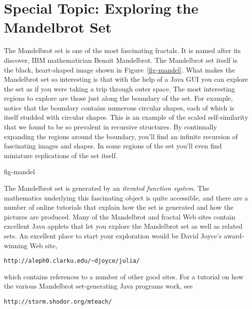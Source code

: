 \section*{{\color{cyan}Special Topic:} Exploring the Mandelbrot Set}

\noindent The Mandelbrot set is one of the most fascinating fractals.
It is named after its discover, IBM mathematician Benoit Mandelbrot.
The Mandelbrot set itself is the black, heart-shaped image shown in
Figure~\ref{fig-mandel}.  What makes the Mandelbrot set so interesting is that
with the help of a Java GUI you can explore the set as if you were
taking a trip through outer space.  %
The most interesting regions to explore are those just along the
boundary of the set.  For example, notice that the boundary contains
numerous circular shapes, each of which is itself studded with
circular shapes.  This is an example of the scaled self-similarity that
we found to be so prevalent in recursive structures.  By continually
expanding the regions around the boundary, you'll find an infinite
recursion of fascinating images and shapes.  In some regions of the set
you'll even find miniature replications of the set itself.  %

{fig-mandel}

The Mandelbrot set is generated by an {\it iterated function system}.
The mathematics underlying this fascinating object is quite
accessible, and there are a number of online tutorials that explain how
the set is generated and how the pictures are produced.  Many of the
Mandelbrot and fractal Web sites contain excellent Java applets that
let you explore the Mandelbrot set as well as related sets.   %
An excellent place to start your exploration would be David Joyce's
award-winning Web site,
\begin{jjjlisting}
\begin{lstlisting}[commentstyle=\color{black}]
http://aleph0.clarku.edu/~djoyce/julia/
\end{lstlisting}
\end{jjjlisting}
\newline which contains references to a number of other good sites.
For a tutorial on how the various Mandelbrot set-generating Java
programs work, see
\begin{jjjlisting}
\begin{lstlisting}[commentstyle=\color{black}]
http://storm.shodor.org/mteach/
\end{lstlisting}
\end{jjjlisting}


